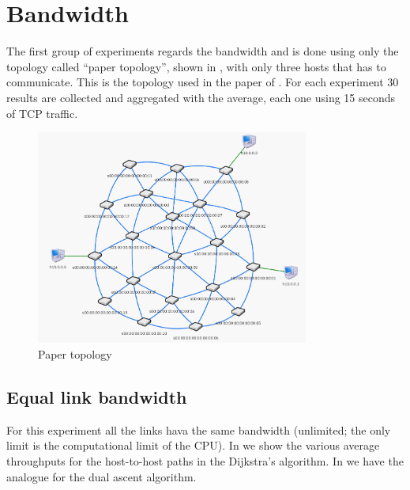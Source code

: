 \section{Bandwidth}\label{sec:bandwidth}

The first group of experiments regards the bandwidth and is done using only the
topology called ``paper topology'', shown in , with only
three hosts that has to communicate. This is the topology used in the paper of
\citeauthor{ilhan-kaplan-dualascent}. For each experiment 30 results are
collected and aggregated with the average, each one using 15 seconds of TCP
traffic.

\begin{figure}[hbt]
	\centering
	\includegraphics[width=0.8\textwidth]{img/papertopo.png}
	\caption{Paper topology}\label{fig:papertopo}
\end{figure}

\subsection{Equal link bandwidth}

For this experiment all the links hava the same bandwidth (unlimited; the only
limit is the computational limit of the CPU). In
 we show the various average throughputs for the
host-to-host paths in the Dijkstra's algorithm. In 
we have the analogue for the dual ascent algorithm.


